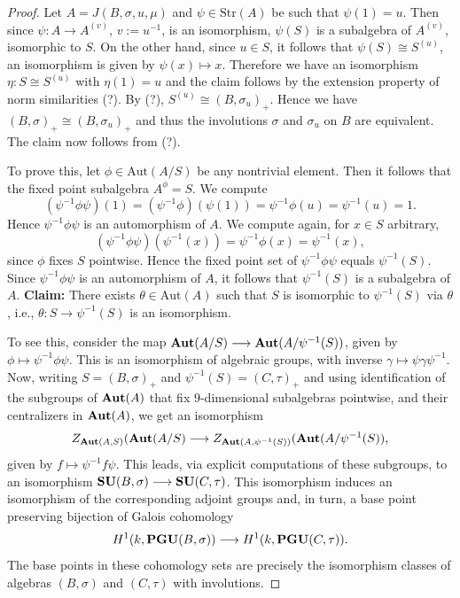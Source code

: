 \documentclass{amsart}
\theoremstyle{definition} %
\theoremstyle{remark} %
\renewcommand{\:}{\colon\,}
\numberwithin{equation}{section}
\begin{document}
\begin{proof} Let $A=J(B,\sigma, u, \mu)$ and $\psi\in\text{Str}(A)$ be such that $\psi(1)=u$. Then since $\psi:A\rightarrow A^{(v)}$, $v := u^{-1}$, is an isomorphism, $\psi(S)$ is a subalgebra of $A^{(v)}$, isomorphic to $S$. On the other hand, since $u\in S$, it follows that $\psi(S)\cong S^{(u)}$, an isomorphism is given by $\psi(x)\mapsto x$. Therefore we have an isomorphism $\eta:S\cong S^{(u)}$ with $\eta(1)=u$ and the claim follows by the extension property of norm similarities (?). By (?), $S^{(u)}\cong (B,\sigma_u)_+$. Hence we have $(B,\sigma)_+\cong (B,\sigma_u)_+$ and thus the involutions $\sigma$ and $\sigma_u$ on $B$ are equivalent. The claim now follows from (?).    
	
	To prove this, let $\phi\in\text{Aut}(A/S)$ be any nontrivial element. Then it follows that the fixed point subalgebra $A^{\phi}=S$. We compute 
	$$(\psi^{-1}\phi\psi)(1)=(\psi^{-1}\phi)(\psi(1))=\psi^{-1}\phi(u)=\psi^{-1}(u)=1.$$
	Hence $\psi^{-1}\phi\psi$ is an automorphism of $A$. We compute again, for $x\in S$ arbitrary,
	$$(\psi^{-1}\phi\psi)(\psi^{-1}(x))=\psi^{-1}\phi(x)=\psi^{-1}(x),$$
	since $\phi$ fixes $S$ pointwise. Hence the fixed point set of $\psi^{-1}\phi\psi$ equals $\psi^{-1}(S)$. Since $\psi^{-1}\phi\psi$ is an automorphism of $A$, it follows that $\psi^{-1}(S)$ is a subalgebra of $A$. 
	\vskip1mm
	\noindent
	{\bf Claim:} There exists $\theta\in\text{Aut}(A)$ such that $S$ is isomorphic to $\psi^{-1}(S)$ via $\theta$, i.e., $\theta:S\longrightarrow\psi^{-1}(S)$ is an isomorphism. 
	
	To see this, consider the map $\text{\bf Aut}(A/S)\longrightarrow\text{\bf Aut}(A/\psi^{-1}(S))$, given by $\phi\mapsto \psi^{-1}\phi\psi     $. This is an isomorphism of algebraic groups, with inverse $\gamma\mapsto\psi\gamma\psi^{-1}$. Now, writing $S=(B,\sigma)_+$ and $\psi^{-1}(S)=(C,\tau)_+$ and using identification of the subgroups of $\text{\bf Aut}(A)$ that fix $9$-dimensional subalgebras pointwise, and their centralizers in $\text{\bf Aut}(A)$, we get an isomorphism 
	$$Z_{\text{\bf Aut}(A,S)}(\text{\bf Aut}(A/S)\longrightarrow Z_{\text{\bf Aut}(A,\psi^{-1}(S))}(\text{\bf Aut}(A/\psi^{-1}(S)),$$ 
	given by $f\mapsto \psi^{-1}f\psi$. This leads, via explicit computations of these subgroups, to an isomorphism 
	$\text{\bf SU}(B,\sigma)\longrightarrow\text{\bf SU}(C,\tau)$. This isomorphism induces an isomorphism of the corresponding adjoint groups 
	and, in turn, a base point preserving bijection of Galois cohomology 
	$$H^1(k, \text{\bf PGU}(B,\sigma))\longrightarrow H^1(k, \text{\bf PGU}(C,\tau)).$$
	The base points in these cohomology sets are precisely the isomorphism classes of algebras $(B,\sigma)$ and $(C,\tau)$ with involutions. 
	

\end{proof}
\end{document}
